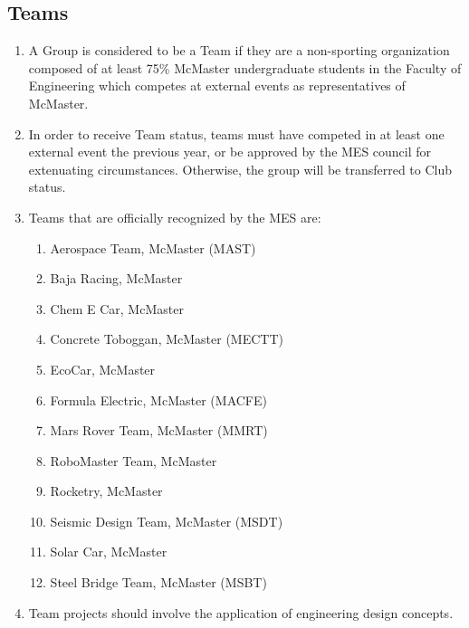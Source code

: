 \subsection{Teams}
\label{teams}
\begin{enumerate}
 \item
  A Group is considered to be a Team if they are a non-sporting organization composed of at least 75\% McMaster undergraduate students in the Faculty of Engineering which competes at external events as representatives of McMaster.
 \item
  In order to receive Team status, teams must have competed in at least one external event the previous year, or be approved by the MES council for extenuating circumstances. Otherwise, the group will be transferred to Club status.
 \item
  Teams that are officially recognized by the MES are:

  \begin{enumerate}
   \item
    Aerospace Team, McMaster (MAST)
   \item
    Baja Racing, McMaster
   \item
    Chem E Car, McMaster
   \item
    Concrete Toboggan, McMaster (MECTT)
   \item
    EcoCar, McMaster
   \item
    Formula Electric, McMaster (MACFE)
   \item
    Mars Rover Team, McMaster (MMRT)
   \item
    RoboMaster Team, McMaster
   \item
    Rocketry, McMaster
   \item
    Seismic Design Team, McMaster (MSDT)
   \item
    Solar Car, McMaster
   \item
    Steel Bridge Team, McMaster (MSBT)
  \end{enumerate}
 \item
  Team projects should involve the application of engineering design concepts.

\end{enumerate}

